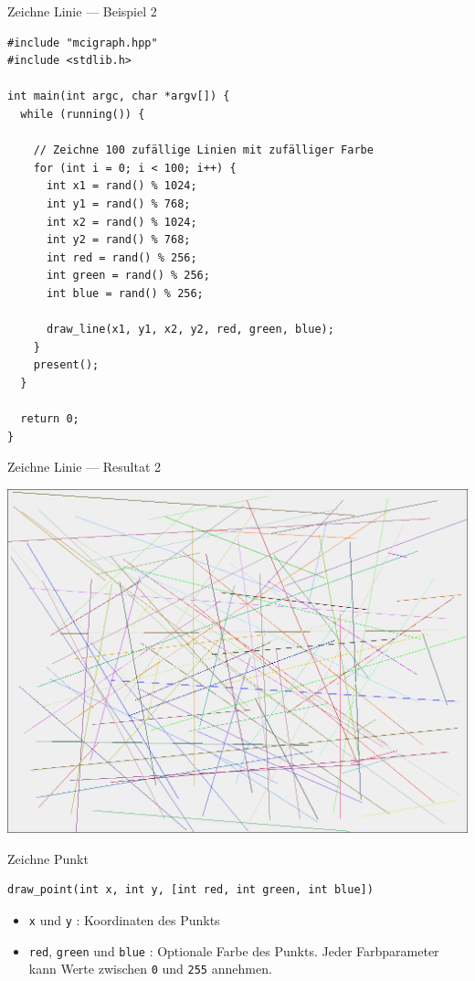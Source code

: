 \documentclass[presentation]{beamer}
\begin{document}
\begin{frame}[label={sec:org7cd61b5},fragile]{Zeichne Linie --- Beispiel 2}
 \begin{verbatim}
#include "mcigraph.hpp"
#include <stdlib.h>

int main(int argc, char *argv[]) {
  while (running()) {

    // Zeichne 100 zufällige Linien mit zufälliger Farbe
    for (int i = 0; i < 100; i++) {
      int x1 = rand() % 1024;
      int y1 = rand() % 768;
      int x2 = rand() % 1024;
      int y2 = rand() % 768;
      int red = rand() % 256;
      int green = rand() % 256;
      int blue = rand() % 256;

      draw_line(x1, y1, x2, y2, red, green, blue);
    }
    present();
  }

  return 0;
}
\end{verbatim}
\end{frame}
\begin{frame}[label={sec:orga40630a}]{Zeichne Linie --- Resultat 2}
\begin{center}\begin{center}
\includegraphics[width=.9\linewidth]{data/db/8df584-32dc-4f72-b1aa-c747e47dac71/screenshot-20170314-212846.png}
\end{center}\end{center}
\end{frame}
\begin{frame}[label={sec:orgda7aaca},fragile]{Zeichne Punkt}
 \begin{verbatim}
draw_point(int x, int y, [int red, int green, int blue])
\end{verbatim}
\begin{itemize}
\item {\color{solarizedYellow}\texttt{x} }und {\color{solarizedYellow}\texttt{y} }: Koordinaten des Punkts
\item {\color{solarizedYellow}\texttt{red}}, {\color{solarizedYellow}\texttt{green} }und {\color{solarizedYellow}\texttt{blue} }: Optionale Farbe des Punkts. Jeder
Farbparameter kann Werte zwischen {\color{solarizedYellow}\texttt{0} }und {\color{solarizedYellow}\texttt{255} }annehmen.
\end{itemize}
\end{frame}
\end{document}
